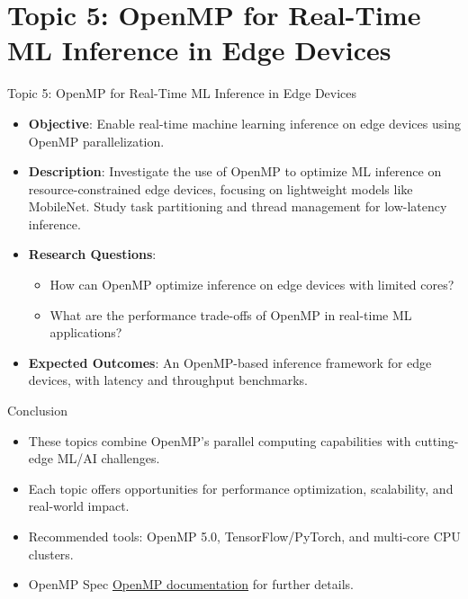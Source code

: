 \documentclass[compress]{beamer}
\begin{document}
\section{Topic 5: OpenMP for Real-Time ML Inference in Edge Devices}
\begin{frame}{Topic 5: OpenMP for Real-Time ML Inference in Edge Devices}
    \begin{itemize}
        \item \textbf{Objective}: Enable real-time machine learning inference on edge devices using OpenMP parallelization.
        \item \textbf{Description}: Investigate the use of OpenMP to optimize ML inference on resource-constrained edge devices, focusing on lightweight models like MobileNet. Study task partitioning and thread management for low-latency inference.
        \item \textbf{Research Questions}:
        \begin{itemize}
            \item How can OpenMP optimize inference on edge devices with limited cores?
            \item What are the performance trade-offs of OpenMP in real-time ML applications?
        \end{itemize}
        \item \textbf{Expected Outcomes}: An OpenMP-based inference framework for edge devices, with latency and throughput benchmarks.
    \end{itemize}
\end{frame}

\begin{frame}{Conclusion}
    \begin{itemize}
        \item These topics combine OpenMP’s parallel computing capabilities with cutting-edge ML/AI challenges.
        \item Each topic offers opportunities for performance optimization, scalability, and real-world impact.
        \item Recommended tools: OpenMP 5.0, TensorFlow/PyTorch, and multi-core CPU clusters.
        \item OpenMP Spec \href{https://www.openmp.org}{OpenMP documentation} for further details.
    \end{itemize}
\end{frame}

\end{document}
